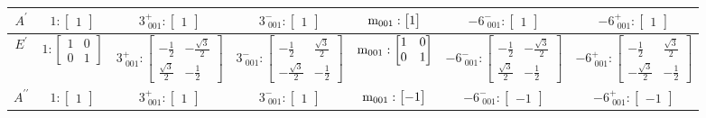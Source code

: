 \documentclass[fleqn,8pt,landscape]{jsarticle}
\begin{document}
\begin{longtable}{ccccccc}
$ A^{\prime} $ & $ 1:\begin{bmatrix} 1 \end{bmatrix} $ & $ 3^{+}_{\,\,001}:\begin{bmatrix} 1 \end{bmatrix} $ & $ 3^{-}_{\,\,001}:\begin{bmatrix} 1 \end{bmatrix} $ & $ {\rm m}_{001}:\begin{bmatrix} 1 \end{bmatrix} $ & $ -6^{-}_{\,\,001}:\begin{bmatrix} 1 \end{bmatrix} $ & $ -6^{+}_{\,\,001}:\begin{bmatrix} 1 \end{bmatrix} $ \\ \hline
$ E^{\prime} $ & $ 1:\begin{bmatrix} 1 & 0 \\ 0 & 1 \end{bmatrix} $ & $ 3^{+}_{\,\,001}:\begin{bmatrix} - \frac{1}{2} & - \frac{\sqrt{3}}{2} \\ \frac{\sqrt{3}}{2} & - \frac{1}{2} \end{bmatrix} $ & $ 3^{-}_{\,\,001}:\begin{bmatrix} - \frac{1}{2} & \frac{\sqrt{3}}{2} \\ - \frac{\sqrt{3}}{2} & - \frac{1}{2} \end{bmatrix} $ & $ {\rm m}_{001}:\begin{bmatrix} 1 & 0 \\ 0 & 1 \end{bmatrix} $ & $ -6^{-}_{\,\,001}:\begin{bmatrix} - \frac{1}{2} & - \frac{\sqrt{3}}{2} \\ \frac{\sqrt{3}}{2} & - \frac{1}{2} \end{bmatrix} $ & $ -6^{+}_{\,\,001}:\begin{bmatrix} - \frac{1}{2} & \frac{\sqrt{3}}{2} \\ - \frac{\sqrt{3}}{2} & - \frac{1}{2} \end{bmatrix} $ \\ \hline
$ A^{\prime\prime} $ & $ 1:\begin{bmatrix} 1 \end{bmatrix} $ & $ 3^{+}_{\,\,001}:\begin{bmatrix} 1 \end{bmatrix} $ & $ 3^{-}_{\,\,001}:\begin{bmatrix} 1 \end{bmatrix} $ & $ {\rm m}_{001}:\begin{bmatrix} -1 \end{bmatrix} $ & $ -6^{-}_{\,\,001}:\begin{bmatrix} -1 \end{bmatrix} $ & $ -6^{+}_{\,\,001}:\begin{bmatrix} -1 \end{bmatrix} $ \\ \hline

\end{longtable}
\end{document}
